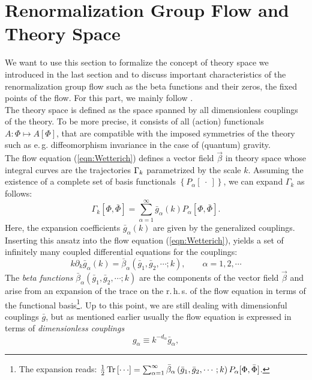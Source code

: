 \section{Renormalization Group Flow and Theory Space}
We want to use this section to formalize the concept of theory space we introduced in the last section and to discuss important characteristics of the renormalization group flow such as the beta functions and their zeros, the fixed points of the flow. For this part, we mainly follow \cite{ReuterSaueressig2012}. \\
The theory space is defined as the space spanned by all dimensionless couplings of the theory. To be more precise, it consists of all (action) functionals $A:\Phi \mapsto A[\Phi]$, that are compatible with the imposed symmetries of the theory such as e.\,g. diffeomorphism invariance in the case of (quantum) gravity. \\
The flow equation (\ref{eqn:Wetterich}) defines a vector field $\vec{\beta}$ in theory space whose integral curves are the trajectories $\Gamma_{k}$ parametrized by the scale $k$. Assuming the existence of a complete set of basis functionals $\left\{P_{\alpha}[\ \cdot \ ]\right\}$, we can expand $\Gamma_k$ as follows:
\begin{equation}
	\Gamma_{k}[\Phi, \bar{\Phi}]=\sum_{\alpha=1}^{\infty} \bar{g}_{\alpha}(k) P_{\alpha}[\Phi, \bar{\Phi}].
\end{equation}
Here, the expansion coefficients $ \bar{g}_{\alpha}(k)$ are given by the generalized couplings. Inserting this ansatz into the flow equation (\ref{eqn:Wetterich}), yields a set of infinitely many coupled differential equations for the couplings:
\begin{equation}
	k \partial_{k} \bar{g}_{\alpha}(k)=\bar{\beta}_{\alpha}\left(\bar{g}_{1}, \bar{g}_{2}, \cdots ; k\right), \qquad \alpha=1,2, \cdots
\end{equation}
The \textit{beta functions} $\bar{\beta}_{\alpha}\left(\bar{g}_{1}, \bar{g}_{2}, \cdots ; k\right)$  are the components of the vector field $\vec{\beta}$ and arise from an expansion of the trace on the r.\,h.\,s. of the flow equation in terms of the functional basis\footnote{The expansion reads: $\frac{1}{2}\tr{\cdots} = \sum_{\alpha=1}^{\infty} \bar{\beta}_{\alpha}\left(\bar{g}_{1}, \bar{g}_{2}, \cdots ; k\right) P_{\alpha}[\Phi, \bar{\Phi}]$.}. Up to this point, we are still dealing with dimensionful couplings $\bar{g}$, but as mentioned earlier usually the flow equation is expressed in terms of \textit{dimensionless couplings}
\begin{equation}
	g_{\alpha} \equiv k^{-d_{\alpha}} \bar{g}_{\alpha},
\end{equation}
